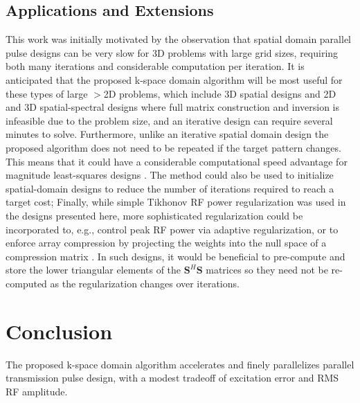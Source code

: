 \subsection*{Applications and Extensions}
This work was initially motivated by the observation that spatial domain parallel pulse designs can be very slow
for 3D problems with large grid sizes, 
requiring both many iterations and considerable computation per iteration. 
It is anticipated that the proposed k-space domain algorithm will be most useful for these types of large $>$2D problems,
which include 3D spatial designs \cite{malik2012tailored} and 2D and 3D spatial-spectral designs \cite{stenger2000three,yang2010four,davids2016fast}
where full matrix construction and inversion is infeasible due to the problem size,
and an iterative design can require several minutes to solve. 
Furthermore, unlike an iterative spatial domain design the proposed algorithm does not need to be repeated if the target pattern changes.
This means that it could have a considerable computational speed advantage for magnitude least-squares designs \cite{setsompop2008magnitude,malik:mrm:2015}. 
The method could also be used to initialize spatial-domain designs to reduce the number of iterations required to reach a target cost; 
Finally, while simple Tikhonov RF power regularization was used in the designs presented here,
more sophisticated regularization could be incorporated to, e.g., control peak RF power via adaptive regularization,
or to enforce array compression by projecting the weights into the null space of a compression matrix .
In such designs, it would be beneficial to pre-compute and store the lower triangular elements of the $\bm{S}^H\bm{S}$ matrices
so they need not be re-computed as the regularization changes over iterations.  

\section*{Conclusion}
The proposed k-space domain algorithm accelerates and finely parallelizes parallel transmission pulse design,
with a modest tradeoff of excitation error and RMS RF amplitude.